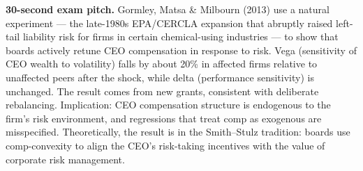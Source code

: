 \documentclass[11pt]{article}
\begin{document}
\begin{keybox}
\textbf{30-second exam pitch.} Gormley, Matsa \& Milbourn (2013) use a natural experiment --- the late-1980s EPA/CERCLA expansion that abruptly raised left-tail liability risk for firms in certain chemical-using industries --- to show that boards actively retune CEO compensation in response to risk. Vega (sensitivity of CEO wealth to volatility) falls by about 20\% in affected firms relative to unaffected peers after the shock, while delta (performance sensitivity) is unchanged. The result comes from new grants, consistent with deliberate rebalancing. Implication: CEO compensation structure is endogenous to the firm's risk environment, and regressions that treat comp as exogenous are misspecified. Theoretically, the result is in the Smith--Stulz tradition: boards use comp-convexity to align the CEO's risk-taking incentives with the value of corporate risk management.
\end{keybox}
\end{document}
